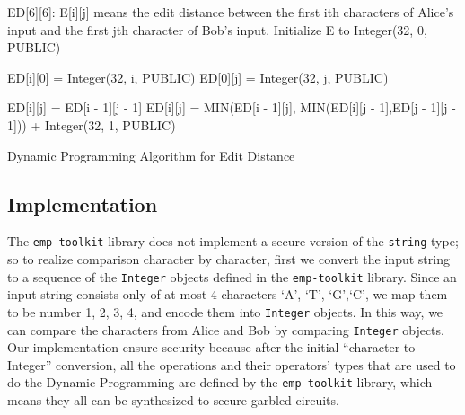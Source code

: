 \begin{algorithm}[h]
    \begin{algorithmic}[1]
        \begin{footnotesize}
        \State ED[6][6]: E[i][j] means the edit distance between the first ith
        characters of Alice's input and the first jth character of Bob's input.
                \State Initialize E to Integer(32, 0, PUBLIC)
            \EndFor

            \State

            \State ED[i][0] = Integer(32, i, PUBLIC)
            \EndFor
            \State ED[0][j] = Integer(32, j, PUBLIC)
            \EndFor

            \State

                        \State ED[i][j] = ED[i - 1][j - 1]
                    \Else
                        \State ED[i][j] = MIN(ED[i - 1][j], MIN(ED[i][j -
                        1],ED[j - 1][j - 1])) + Integer(32, 1, PUBLIC)
                    \EndIf
                \EndFor
            \EndFor
        \EndFunction
        \end{footnotesize}
    \end{algorithmic}
    \caption{Dynamic Programming Algorithm for Edit Distance}
    \label{alg:ed_dp}
\end{algorithm}

\subsection{Implementation}
The {\tt emp-toolkit} library does not implement a secure version of the
{\tt string} type; so to realize comparison character by character, first we
convert the input string to a sequence of the {\tt Integer} objects defined
in the {\tt emp-toolkit} library. Since an input string consists only of
at most 4 characters `A', `T', `G',`C', we map them to be number 1, 2, 3, 4,
and encode them into {\tt Integer} objects.
In this way, we can compare the characters from Alice and Bob by comparing
{\tt Integer} objects. Our implementation ensure security because after the
initial ``character to Integer'' conversion, all
the operations and their operators' types that are used to do the
Dynamic Programming are defined by the {\tt emp-toolkit} library, which means
they all can be synthesized to secure garbled circuits.
